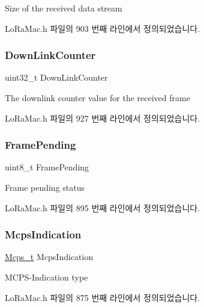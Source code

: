 Size of the received data stream 

Lo\+Ra\+Mac.\+h 파일의 903 번째 라인에서 정의되었습니다.

\mbox{\label{structs_mcps_indication_a7a566925baf83b1b3da9209dfa4bb79a}} 
\subsubsection{\texorpdfstring{Down\+Link\+Counter}{DownLinkCounter}}
{\footnotesize\ttfamily uint32\+\_\+t Down\+Link\+Counter}

The downlink counter value for the received frame 

Lo\+Ra\+Mac.\+h 파일의 927 번째 라인에서 정의되었습니다.

\mbox{\label{structs_mcps_indication_a123aed553ea78b5967618c22147a7f4c}} 
\subsubsection{\texorpdfstring{Frame\+Pending}{FramePending}}
{\footnotesize\ttfamily uint8\+\_\+t Frame\+Pending}

Frame pending status 

Lo\+Ra\+Mac.\+h 파일의 895 번째 라인에서 정의되었습니다.

\mbox{\label{structs_mcps_indication_af45477156b4a2e186b2bfa2afb3a4efc}} 
\subsubsection{\texorpdfstring{Mcps\+Indication}{McpsIndication}}
{\footnotesize\ttfamily \mbox{\hyperlink{group___l_o_r_a_m_a_c_ga670d0c87a52aeb13391f303a4cf94f00}{Mcps\+\_\+t}} Mcps\+Indication}

M\+C\+P\+S-\/\+Indication type 

Lo\+Ra\+Mac.\+h 파일의 875 번째 라인에서 정의되었습니다.

